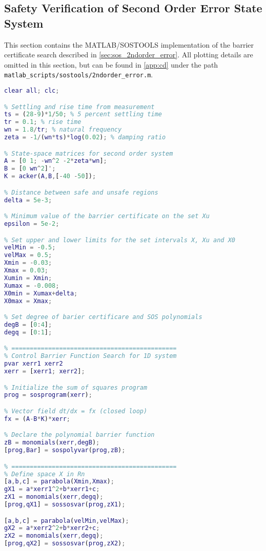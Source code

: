 \subsection{Safety Verification of Second Order Error State System}\label{app:sos_errorstate_secondorder}
This section contains the MATLAB/SOSTOOLS implementation of the barrier certificate search described in \autoref{sec:sos_2ndorder_error}. All plotting details are omitted in this section, but can be found in \autoref{app:cd} under the path \texttt{matlab\_scripts/sostools/2ndorder\_error.m}.

\begin{lstlisting}[language=matlab]
% 1D second order system FOR ERROR STATE
clear all; clc; 

% Settling and rise time from measurement
ts = (28-9)*1/50; % 5 percent settling time
tr = 0.1; % rise time
wn = 1.8/tr; % natural frequency
zeta = -1/(wn*ts)*log(0.02); % damping ratio

% State-space matrices for second order system
A = [0 1; -wn^2 -2*zeta*wn];
B = [0 wn^2]';
K = acker(A,B,[-40 -50]);

% Distance between safe and unsafe regions
delta = 5e-3;

% Minimum value of the barrier certificate on the set Xu
epsilon = 5e-2;

% Set upper and lower limits for the set intervals X, Xu and X0
velMin = -0.5;
velMax = 0.5;
Xmin = -0.03;
Xmax = 0.03;
Xumin = Xmin;
Xumax = -0.008;
X0min = Xumax+delta;
X0max = Xmax;

% Set degree of barier certificare and SOS polynomials
degB = [0:4];
degq = [0:1];

% =============================================
% Control Barrier Function Search for 1D system
pvar xerr1 xerr2
xerr = [xerr1; xerr2];

% Initialize the sum of squares program
prog = sosprogram(xerr);

% Vector field dt/dx = fx (closed loop)
fx = (A-B*K)*xerr;

% Declare the polynomial barrier function
zB = monomials(xerr,degB);
[prog,Bar] = sospolyvar(prog,zB);

% =============================================
% Define space X in Rn
[a,b,c] = parabola(Xmin,Xmax); 
gX1 = a*xerr1^2+b*xerr1+c;
zX1 = monomials(xerr,degq);
[prog,qX1] = sossosvar(prog,zX1);

[a,b,c] = parabola(velMin,velMax);
gX2 = a*xerr2^2+b*xerr2+c;
zX2 = monomials(xerr,degq);
[prog,qX2] = sossosvar(prog,zX2);


\end{lstlisting}
